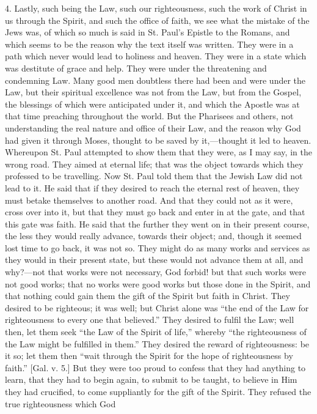 4. Lastly, such being the Law, such our righteousness, such the
work of Christ in us through the Spirit, and such the office of faith,
we see what the mistake of the Jews was, of which so much is said in
St. Paul's Epistle to the Romans, and which seems to be the reason why
the text itself was written. They were in a path which never would
lead to holiness and heaven. They were in a state which was destitute
of grace and help. They were under the threatening and condemning Law.
Many good men doubtless there had been and were under the Law, but
their spiritual excellence was not from the Law, but from the Gospel,
the blessings of which were anticipated under it, and which the
Apostle was at that time preaching throughout the world. But the
Pharisees and others, not understanding the real nature and office of
their Law, and the reason why God had given it through Moses, thought
to be saved by it,—thought it led to heaven. Whereupon St. Paul
attempted to show them that they were, as I may say, in the wrong
road. They aimed at eternal life; that was the object towards which
they professed to be travelling. Now St. Paul told them that the
Jewish Law did not lead to it. He said that if they desired to reach
the eternal rest of heaven, they must betake themselves to another
road. And that they could not as it were, cross over into it, but that
they must go back and enter in at the gate, and that this gate was
faith. He said that the further they went on in their present course,
the less they would really advance, towards their object; and, though
it seemed lost time to go back, it was not so. They might do as many
works and services as they would in their present state, but these
would not advance them at all, and why?—not that works were not
necessary, God forbid! but that such works were not good works; that
no works were good works but those done in the Spirit, and that
nothing could gain them the gift of the Spirit but faith in Christ.
They desired to be righteous; it was well; but Christ alone was
``the end of the Law for righteousness to every one that
believed.'' They desired to fulfil the Law; well then, let them
seek ``the Law of the Spirit of life,'' whereby ``the
righteousness of the Law might be fulfilled in them.'' They
desired the reward of righteousness: be it so; let them then
``wait through the Spirit for the hope of righteousness by
faith.'' [Gal. v. 5.] But they were too proud to confess that they
had anything to learn, that they had to begin again, to submit to be
taught, to believe in Him they had crucified, to come suppliantly for
the gift of the Spirit. They refused the true righteousness which God
